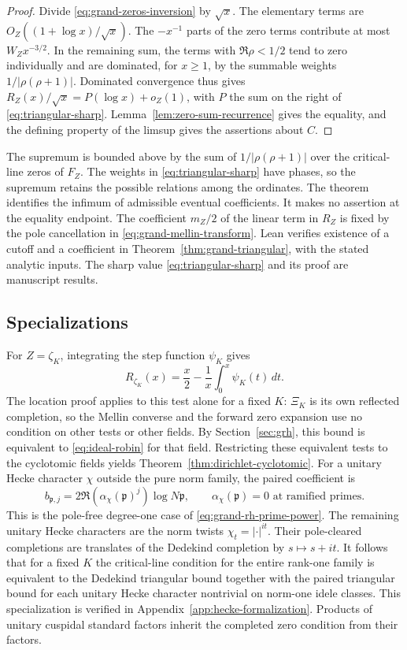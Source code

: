 \documentclass[11pt]{amsart}
\theoremstyle{definition}
\theoremstyle{remark}
\numberwithin{equation}{section}
\begin{document}
\begin{proof}
Divide \eqref{eq:grand-zeros-inversion} by \(\sqrt{x}\).
The elementary terms are \(O_Z((1+\log x)/\sqrt{x})\).
The \(-x^{-1}\) parts of the zero terms contribute
at most \(W_Z x^{-3/2}\). In the remaining sum, the terms with
\(\Re\rho<1/2\) tend to zero individually and are dominated,
for \(x\ge1\), by the summable weights \(1/|\rho(\rho+1)|\).
Dominated convergence thus gives \(R_Z(x)/\sqrt{x}
=P(\log x)+o_Z(1)\), with \(P\) the sum on the right of
\eqref{eq:triangular-sharp}. Lemma~\ref{lem:zero-sum-recurrence}
gives the equality, and the defining property of the limsup
gives the assertions about \(C\).
\end{proof}

The supremum is bounded above by the sum of
\(1/|\rho(\rho+1)|\) over the critical-line zeros of \(F_Z\).
The weights in \eqref{eq:triangular-sharp} have phases, so
the supremum retains the possible relations among the ordinates.
The theorem identifies the infimum of admissible eventual
coefficients. It makes no assertion at the equality endpoint.
The coefficient \(m_Z/2\) of the linear term in \(R_Z\) is
fixed by the pole cancellation in \eqref{eq:grand-mellin-transform}.
Lean verifies existence of a cutoff and a coefficient in
Theorem~\ref{thm:grand-triangular}, with the stated analytic inputs.
The sharp value \eqref{eq:triangular-sharp} and its proof are
manuscript results.

\subsection{Specializations}

For \(Z=\zeta_K\), integrating the step function \(\psi_K\) gives
\[
 R_{\zeta_K}(x)=\frac{x}{2}-\frac{1}{x}\int_0^x\psi_K(t)\,dt .
\]
The location proof applies to this test alone for a fixed \(K\):
\(\Xi_K\) is its own reflected completion, so the Mellin
converse and the forward zero expansion use no condition on
other tests or other fields. By Section~\ref{sec:grh}, this bound is
equivalent to \eqref{eq:ideal-robin} for that field. Restricting
these equivalent tests to the cyclotomic fields yields
Theorem~\ref{thm:dirichlet-cyclotomic}. For a
unitary Hecke character \(\chi\) outside the pure norm family,
the paired coefficient is
\[
 b_{\mathfrak p,j}=2\Re(\alpha_\chi(\mathfrak p)^j)\log N\mathfrak p,
 \qquad \alpha_\chi(\mathfrak p)=0\text{ at ramified primes}.
\]
This is the pole-free degree-one case of
\eqref{eq:grand-rh-prime-power}. The remaining unitary Hecke
characters are the norm twists \(\chi_t=|\cdot|^{it}\). Their
pole-cleared completions are translates of the Dedekind
completion by \(s\mapsto s+it\). It follows that for a fixed
\(K\) the critical-line condition for the entire rank-one family
is equivalent to the Dedekind triangular bound together with
the paired triangular bound for each unitary Hecke character
nontrivial on norm-one idele classes. This specialization is
verified in Appendix~\ref{app:hecke-formalization}.
Products of unitary cuspidal standard factors inherit the
completed zero condition from their factors.
\end{document}
